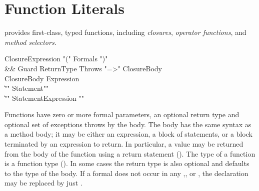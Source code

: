 %


\section{Function Literals}
\label{FunctionLiteral}

\Xten{} provides first-class, typed functions, including
\emph{closures}, \emph{operator functions}, and \emph{method
  selectors}.

\begin{grammar}
ClosureExpression \:
        \xcd"("
        Formals\opt
        \xcd")"
\\ &&
        Guard\opt
        ReturnType\opt
        Throws\opt
        \xcd"=>" ClosureBody \\
ClosureBody \:
        Expression \\
        \| \xcd"{" Statement\star \xcd"}" \\
        \| \xcd"{" Statement\star Expression \xcd"}" \\
\end{grammar}

Functions have zero or more formal parameters, an optional return type
and optional set of exceptions throws by the body.  The body has the
same syntax as a method body; it may be either an expression, a block
of statements, or a block terminated by an expression to return. In
particular, a value may be returned from the body of the function
using a return statement (). The type of a
function is a function type ().  In some cases the
return type  is also optional and defaults to the type of the
body. If a formal  does not occur in any
,, or , the declaration  may
be replaced by just .

\label{ClosureGuard}

